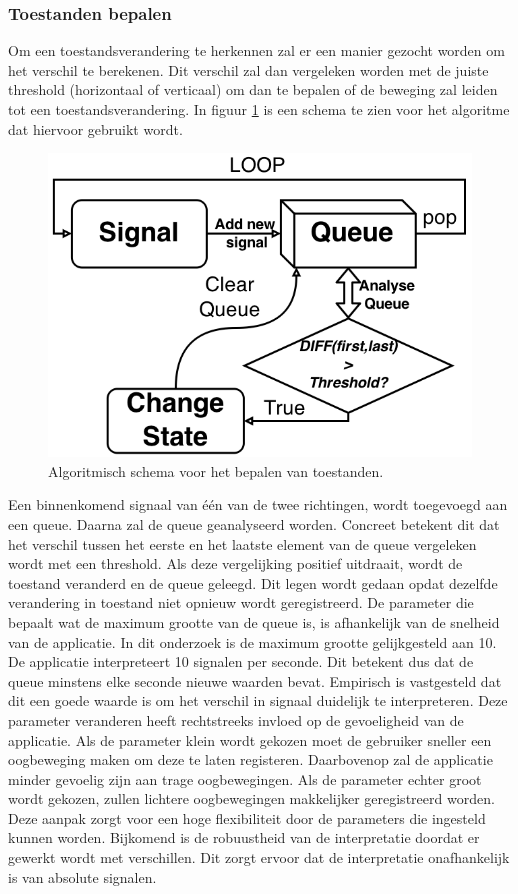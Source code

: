 \documentclass{article}
\newcommand{\figwidth}{0.75\linewidth}
\begin{document}
\subsubsection*{Toestanden bepalen}
Om een toestandsverandering te herkennen zal er een manier gezocht worden om het verschil te berekenen. Dit verschil zal dan vergeleken worden met de juiste threshold (horizontaal of verticaal) om dan te bepalen of de beweging zal leiden tot een toestandsverandering. In figuur \ref{fig:algostatefilter} is een schema te zien voor het algoritme dat hiervoor gebruikt wordt.
\begin{figure}[H]
	\centering
	\includegraphics[width=\figwidth]{images/StateFilter_bw}
	\caption{Algoritmisch schema voor het bepalen van toestanden.}
	\label{fig:algostatefilter}
\end{figure}
Een binnenkomend signaal van \'e\'en van de twee richtingen, wordt toegevoegd aan een queue. Daarna zal de queue geanalyseerd worden. Concreet betekent dit dat het verschil tussen het eerste en het laatste element van de queue vergeleken wordt met een threshold. Als deze vergelijking positief uitdraait, wordt de toestand veranderd en de queue geleegd. Dit legen wordt gedaan opdat dezelfde verandering in toestand niet opnieuw wordt geregistreerd.
De parameter die bepaalt wat de maximum grootte van de queue is, is afhankelijk van de snelheid van de applicatie. In dit onderzoek is de maximum grootte gelijkgesteld aan 10. De applicatie interpreteert 10 signalen per seconde. Dit betekent dus dat de queue minstens elke seconde nieuwe waarden bevat. Empirisch is vastgesteld dat dit een goede waarde is om het verschil in signaal duidelijk te interpreteren. Deze parameter veranderen heeft rechtstreeks invloed op de gevoeligheid van de applicatie. Als de parameter klein wordt gekozen moet de gebruiker sneller een oogbeweging maken om deze te laten registeren. Daarbovenop zal de applicatie minder gevoelig zijn aan trage oogbewegingen. Als de parameter echter groot wordt gekozen, zullen lichtere oogbewegingen makkelijker geregistreerd worden. Deze aanpak zorgt voor een hoge flexibiliteit door de parameters die ingesteld kunnen worden. Bijkomend is de robuustheid van de interpretatie doordat er gewerkt wordt met verschillen. Dit zorgt ervoor dat de interpretatie onafhankelijk is van absolute signalen.
\end{document}
